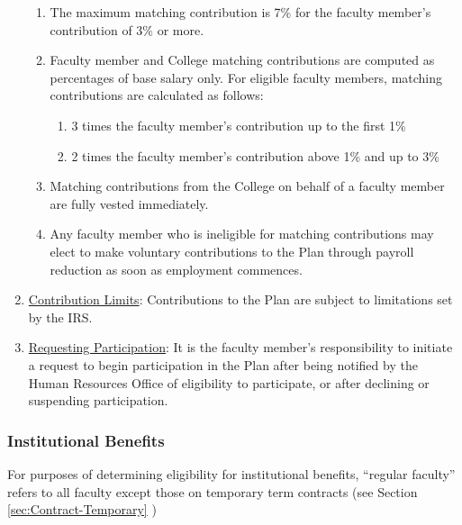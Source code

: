 \begin{enumerate}[label=\alph*)]
{\begin{enumerate}[label=\arabic*)]
							\item{The maximum matching contribution is 7\% for
								the faculty member's contribution of 3\% or more.  }

							\item{Faculty member and College matching
								contributions are computed as percentages of base
								salary only.  For eligible faculty members, matching
								contributions are calculated as follows:

								\begin{enumerate}[label=(\alph*)]
									\item{3 times the faculty member's contribution up
										to the first 1\%}
									\item{ 2 times the faculty member's
										contribution above 1\% and
										up to 3\%}
								\end{enumerate}
							}

							\item{Matching contributions from the College on
								behalf of a faculty member are fully vested
								immediately. }

							\item{Any faculty member who is ineligible for
								matching contributions may elect to make voluntary
								contributions to the Plan through payroll reduction
								as soon as employment commences. }

						\end{enumerate}
					}



					\item{\underline{Contribution Limits}:  Contributions to the
						Plan are subject to limitations set by the IRS.}

					\item{\underline{Requesting Participation}:  It is the
						faculty member's responsibility to initiate a request to
						begin participation in the Plan after being notified by the
						Human Resources Office of eligibility to participate, or
						after declining or suspending participation.}

				\end{enumerate}
		\subsubsection{Institutional Benefits}
			For purposes of determining eligibility for institutional benefits, ``regular faculty'' refers to all faculty except those on temporary term contracts (see
			Section
			\ref{sec:Contract-Temporary}
			)


